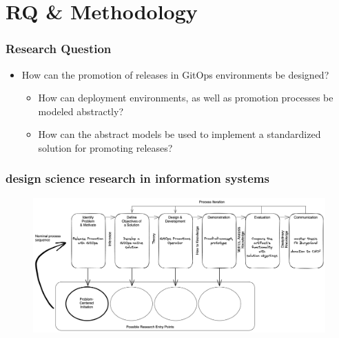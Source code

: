 \documentclass{beamer}
\begin{document}
\section{RQ \& Methodology}

\begin{frame}
\frametitle{Research Question}

	\begin{itemize}
		\item How can the promotion of releases in GitOps environments be designed?
		\begin{itemize}
			\item How can deployment environments, as well as promotion processes be modeled abstractly?
			\item How can the abstract models be used to implement a standardized solution for promoting releases?
		\end{itemize}
	\end{itemize}

\end{frame}



\begin{frame}
	\frametitle{design science research in information systems \\
		\autocite{designScienceResearchMethodologyForInformationSystemsResearch}}
	
	\begin{figure}[h]
		\centering
		\includegraphics[width=1.00\linewidth]{figures/dsrm-process-release-promotion-gitops.png}
	\end{figure}

\end{frame}
\end{document}

